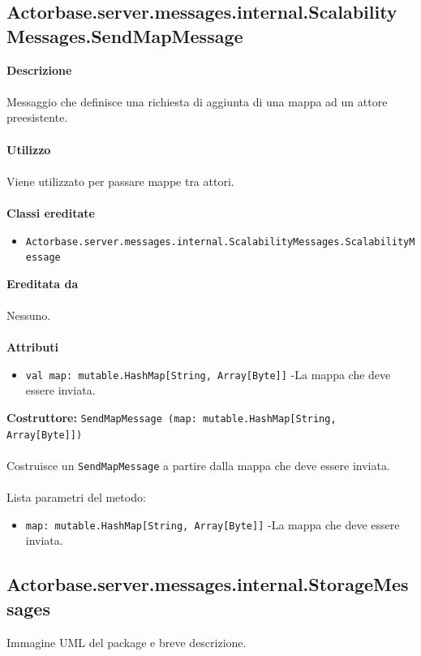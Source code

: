 \documentclass[a4paper]{article}
\begin{document}
	\subsection{Actorbase.server.messages.internal.ScalabilityMessages.SendMapMessage}
		\textbf{Descrizione}
			\\ \\
			Messaggio che definisce una richiesta di aggiunta di una mappa ad un attore preesistente.
			\\ \\
		\textbf{Utilizzo}
			\\ \\
			Viene utilizzato per passare mappe tra attori.
			\\ \\
		\textbf{Classi ereditate}
			\begin{itemize}
				\item \texttt{Actorbase.server.messages.internal.ScalabilityMessages.ScalabilityMessage}
			\end{itemize}
		\textbf{Ereditata da}
			\\ \\
			Nessuno.
			\\ \\
		\textbf{Attributi}
			\begin{itemize}
				\item \texttt{val map: mutable.HashMap[String, Array[Byte]]} -La mappa che deve essere inviata.
			\end{itemize}
		\textbf{Costruttore:} \texttt{SendMapMessage (map: mutable.HashMap[String, Array[Byte]])}
		\\ \\
		Costruisce un \texttt{SendMapMessage} a partire dalla mappa che deve essere inviata.
		\\ \\
		Lista parametri del metodo:
			\begin{itemize}
				\item \texttt{map: mutable.HashMap[String, Array[Byte]]} -La mappa che deve essere inviata.
			\end{itemize}
			
	\subsection{Actorbase.server.messages.internal.StorageMessages}
		Immagine UML del package e breve descrizione.
		
\end{document}
